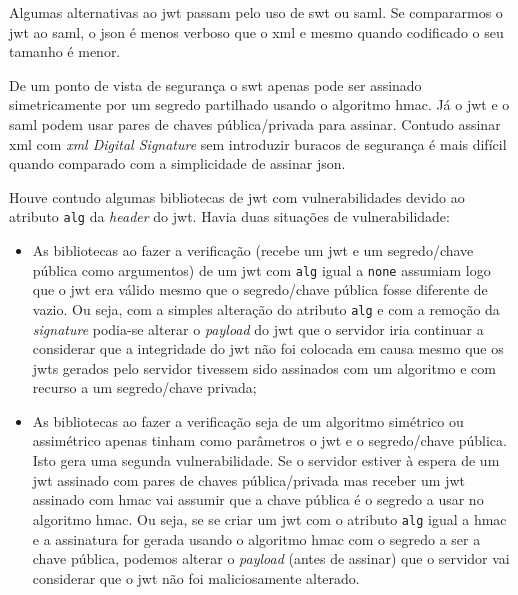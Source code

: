 Algumas alternativas ao \acrshort{jwt} passam pelo uso de \acrfull{swt} ou \acrfull{saml}. 
Se compararmos o \acrshort{jwt} ao \acrshort{saml}, o \acrshort{json} é menos verboso que o 
\acrshort{xml} e mesmo quando codificado o seu tamanho é menor. 

De um ponto de vista de segurança o \acrshort{swt} apenas pode ser assinado simetricamente por um segredo 
partilhado usando o algoritmo \acrshort{hmac}. Já o \acrshort{jwt} e o \acrshort{saml} podem usar pares de 
chaves pública/privada para assinar. Contudo assinar \acrshort{xml} com 
\textit{\acrshort{xml} Digital Signature} sem introduzir buracos de segurança é mais difícil quando comparado 
com a simplicidade de assinar \acrshort{json}.~\cite{jwtio}

Houve contudo algumas bibliotecas de \acrshort{jwt} com vulnerabilidades devido ao atributo \texttt{alg} da 
\textit{header} do \acrshort{jwt}. Havia duas situações de vulnerabilidade:
\begin{itemize}
    \item As bibliotecas ao fazer a verificação (recebe um \acrshort{jwt} e um segredo/chave pública como 
    argumentos) de um \acrshort{jwt} com \texttt{alg} igual a \texttt{none} assumiam logo que o \acrshort{jwt} 
    era válido mesmo que o segredo/chave pública fosse diferente de vazio. Ou seja, com a simples alteração do 
    atributo \texttt{alg} e com a remoção da \textit{signature} podia-se alterar o \textit{payload} do 
    \acrshort{jwt} que o servidor iria continuar a considerar que a integridade do \acrshort{jwt} não foi colocada 
    em causa mesmo que os \acrshort{jwt}s gerados pelo servidor tivessem sido assinados com um algoritmo e 
    com recurso 
    a um segredo/chave privada;

    \item As bibliotecas ao fazer a verificação seja de um algoritmo simétrico ou assimétrico apenas tinham 
    como parâmetros o \acrshort{jwt} e o segredo/chave pública. Isto gera uma segunda vulnerabilidade. Se o 
    servidor estiver à espera de um \acrshort{jwt} assinado com pares de chaves pública/privada mas receber 
    um \acrshort{jwt} assinado com \acrshort{hmac} vai assumir que a chave pública é o segredo a usar no algoritmo 
    \acrshort{hmac}. Ou seja, se se criar um \acrshort{jwt} com o atributo \texttt{alg} igual a \acrshort{hmac} 
    e a assinatura for gerada usando o algoritmo \acrshort{hmac} com o segredo a ser a chave pública, podemos 
    alterar o \textit{payload} (antes de assinar) que o servidor vai considerar que o \acrshort{jwt} não foi 
    maliciosamente alterado.
\end{itemize}

